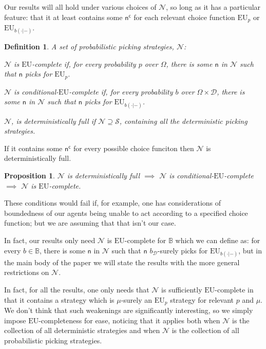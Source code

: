 \documentclass[a4paper]{article}
\newtheorem{definition}{Definition}
\newtheorem{proposition}[theorem]{Proposition}
\newcommand\EU{\mathrm{EU}}
\newcommand{\Decs}{\mathcal{D}}
\renewcommand\S{\mathcal{S}}
\renewcommand\c{\mathsf{c}} %
\newcommand{\n}{\mathsf{n}}
\renewcommand{\nu}{\n}
\newcommand\Nu{\mathcal{N}}
\newcommand{\IB}{\mathbb{B}}
\renewcommand{\color}[1]{}
\newenvironment{colored}[1]{\leavevmode\color{#1}}{}
\newenvironment{CCM rewritten}
{\begingroup\color{blue}} %
{\endgroup}              %
\begin{document}
	\begin{colored}{violet}
Our results will all hold under various choices of $\Nu$, so long as it has a particular feature: 
that it at least contains some $\nu^\c$ for each relevant choice function $\EU_p$ or $\EU_{b(\cdot|-)}$.
\begin{definition}\label{def:EU-complete}
	A set of probabilistic picking strategies, $\Nu$:
	
	$\Nu$ is \emph{$\EU$-complete} if, for every probability $p$ over $\Omega$, there is some $\n$ in $\Nu$ such that $\n$ picks for $\EU_p$.
	
	$\Nu$ is \emph{conditional-$\EU$-complete} if, for every probability $b$ over $\Omega\times\Decs$, there is some $\n$ in $\Nu$ such that $\n$ picks for $\EU_{b(\cdot|-)}$.

		
	$\Nu$, is \emph{deterministically full} if $\Nu\supseteq\S$, containing all the deterministic picking strategies. 

		

\end{definition}
If it contains some $\nu^\c$ for every possible choice funciton then $\Nu$ is deterministically full. 
\begin{proposition}
 $\Nu$ is deterministically full
		$\implies$  $\Nu$ is  conditional-$\EU$-complete 
		$\implies$  $\Nu$ is  $\EU$-complete.
\end{proposition}

These conditions would fail if, for example, one has considerations of boundedness of our agents being unable to act according to a specified choice function; but we are assuming that that isn't our case. 

In fact, our results only need 	$\Nu$ is {$\EU$-complete for $\IB$} which we can define as: for every  $b\in \IB$, there is some $\n$ in $\Nu$ such that $\n$ $b_\Decs$-surely picks for $\EU_{b(\cdot|-)}$,  but in the main body of the paper we will state the results with the more general restrictions on $\Nu$.
	
\end{colored}
	
	

\begin{colored}{red}
	In fact, for all the results, one only needs that $\Nu$ is sufficiently $\EU$-complete in that it contains a strategy which is $\mu$-surely an $\EU_p$ strategy for relevant $p$ and $\mu$. We don't think that such weakenings are significantly interesting, so we simply impose $\EU$-completeness for ease, noticing that it applies both when $\Nu$ is the collection of all deterministic strategies and when $\Nu$ is the collection of all probabilistic picking strategies. 
\end{colored}
\end{document}
